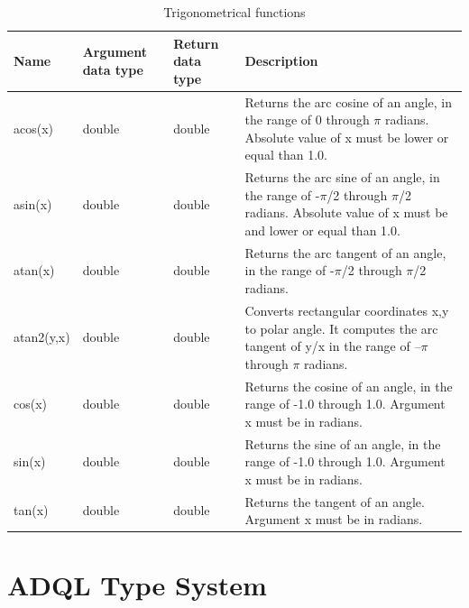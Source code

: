 \documentclass[11pt,a4paper]{ivoa}
\begin{document}
\begin{table}[thm]\footnotesize
    \begin{tabular}{|p{}|p{}|p{}|p{}|}
        \hline

        \hline
        \textbf{Name} &
        \textbf{Argument \newline data type} &
        \textbf{Return \newline data type} &
        \textbf{Description}
        \tabularnewline

        \hline
        acos(x) &
        double &
        double &
        Returns the arc cosine of an angle, in the range of 0 through \(\pi\) radians. Absolute value of x must be lower or equal than 1.0.
        \tabularnewline

        \hline
        asin(x) &
        double &
        double &
        Returns the arc sine of an angle, in the range of -\(\pi\)/2 through \(\pi\)/2 radians. Absolute value of x must be and lower or equal than 1.0.
        \tabularnewline

        \hline
        atan(x) &
        double &
        double &
        Returns the arc tangent of an angle, in the range of -\(\pi\)/2 through \(\pi\)/2 radians.
        \tabularnewline
        
        \hline
        atan2(y,x) &
        double &
        double &
        Converts rectangular coordinates x,y to polar angle. It computes the arc tangent of y/x in the range of –\(\pi\) through \(\pi\) radians.
        \tabularnewline

        \hline
        cos(x) &
        double &
        double &
        Returns the cosine of an angle, in the range of -1.0 through 1.0. Argument x must be in radians.
        \tabularnewline

        \hline
        sin(x) &
        double &
        double &
        Returns the sine of an angle, in the range of -1.0 through 1.0. Argument x must be in radians.
        \tabularnewline

        \hline
        tan(x) &
        double &
        double &
        Returns the tangent of an angle. Argument x must be in radians.
        \tabularnewline

        \hline
    \end{tabular}
    \caption{Trigonometrical functions}
    \label{table:trig.functions.table}
\end{table}

\clearpage
\section{ADQL Type System}
\label{sec:types}
\end{document}
